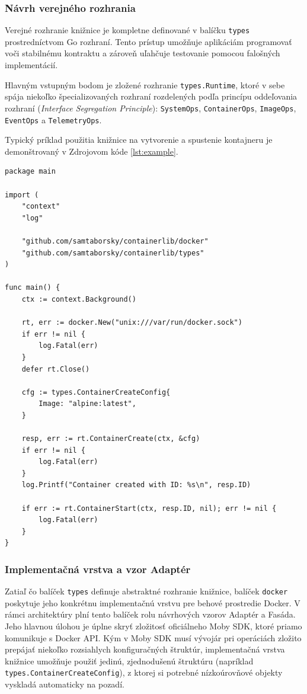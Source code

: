 \documentclass[
 program=infpvs,
  language=slovak,
  figures=false,
  tables=false,
  sourcecodes,
  glossaries,
  index
]{kidiplom}
\begin{document}
{\subsubsection{Návrh verejného rozhrania}  \label{sec:navrh-rozhrania}
Verejné rozhranie knižnice je kompletne definované v balíčku \texttt{types} prostredníctvom Go rozhraní. Tento prístup umožňuje aplikáciám programovať voči stabilnému kontraktu a zároveň uľahčuje testovanie pomocou falošných implementácií.

Hlavným vstupným bodom je zložené rozhranie \texttt{types.Runtime}, ktoré v sebe spája niekoľko špecializovaných rozhraní rozdelených podľa princípu oddeľovania rozhraní (\textit{Interface Segregation Principle}): \texttt{SystemOps}, \texttt{ContainerOps}, \texttt{ImageOps}, \texttt{EventOps} a \texttt{TelemetryOps}.

Typický príklad použitia knižnice na vytvorenie a spustenie kontajneru je demonštrovaný v Zdrojovom kóde \ref{lst:example}.

\begin{lstlisting}[caption={Príklad použitia knižnice na vytvorenie a spustenie kontajneru.}, label={lst:example}]
package main

import (
    "context"
    "log"

    "github.com/samtaborsky/containerlib/docker"
    "github.com/samtaborsky/containerlib/types"
)

func main() {
    ctx := context.Background()

    rt, err := docker.New("unix:///var/run/docker.sock")
    if err != nil {
        log.Fatal(err)
    }
    defer rt.Close()

    cfg := types.ContainerCreateConfig{
        Image: "alpine:latest",
    }

    resp, err := rt.ContainerCreate(ctx, &cfg)
    if err != nil {
        log.Fatal(err)
    }
    log.Printf("Container created with ID: %s\n", resp.ID)

    if err := rt.ContainerStart(ctx, resp.ID, nil); err != nil {
        log.Fatal(err)
    }
}
\end{lstlisting}



\subsubsection{Implementačná vrstva a vzor Adaptér}  \label{sec:implementacna-vrstva}
Zatiaľ čo balíček \texttt{types} definuje abstraktné rozhranie knižnice, balíček \texttt{docker} poskytuje jeho konkrétnu implementačnú vrstvu pre behové prostredie Docker. V rámci architektúry plní tento balíček rolu návrhových vzorov Adaptér a Fasáda. Jeho hlavnou úlohou je úplne skryť zložitosť oficiálneho Moby SDK, ktoré priamo komunikuje s Docker API. Kým v Moby SDK musí vývojár pri operáciách zložito prepájať niekoľko rozsiahlych konfiguračných štruktúr, implementačná vrstva knižnice umožňuje použiť jedinú, zjednodušenú štruktúru (napríklad \texttt{types.ContainerCreateConfig}), z ktorej si potrebné nízkoúrovňové objekty vyskladá automaticky na pozadí.

}
\end{document}

